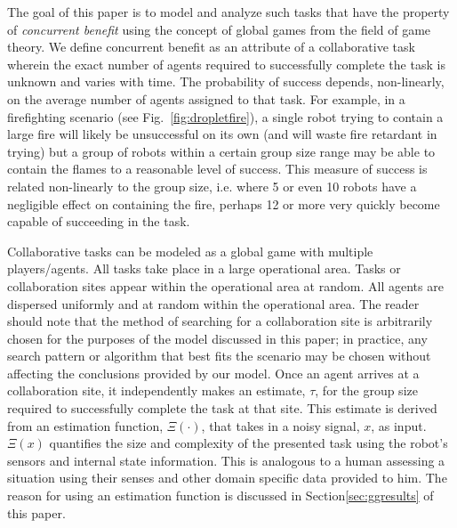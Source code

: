 \documentclass[conference]{ieeeconf}
\begin{document}
The goal of this paper is to model and analyze such tasks that have the property of \emph{concurrent benefit} using the concept of global games from the field of game theory. We define concurrent benefit as an attribute of a collaborative task wherein the exact number of agents required to successfully complete the task is unknown and varies with time. The probability of success depends, non-linearly, on the average number of agents assigned to that task. For example, in a firefighting scenario (see Fig.~\ref{fig:dropletfire}), a single robot trying to contain a large fire will likely be unsuccessful on its own (and will waste fire retardant in trying) but a group of robots within a certain group size range may be able to contain the flames to a reasonable level of success. This measure of success is related non-linearly to the group size, i.e. where 5 or even 10 robots have a negligible effect on containing the fire, perhaps 12 or more very quickly become capable of succeeding in the task.

Collaborative tasks can be modeled as a global game with multiple players/agents. All tasks take place in a large operational area. Tasks or collaboration sites appear within the operational area at random. All agents are dispersed uniformly and at random within the operational area. The reader should note that the method of searching for a collaboration site is arbitrarily chosen for the purposes of the model discussed in this paper; in practice, any search pattern or algorithm that best fits the scenario may be chosen without affecting the conclusions provided by our model. Once an agent arrives at a collaboration site, it independently makes an estimate, $\tau$, for the group size required to successfully complete the task at that site. This estimate is derived from an estimation function, $\Xi(\cdot)$, that takes in a noisy signal, $x$, as input. $\Xi(x)$ quantifies the size and complexity of the presented task using the robot's sensors and internal state information. This is analogous to a human assessing a situation using their senses and other domain specific data provided to him. The reason for using an estimation function is discussed in Section\ref{sec:ggresults} of this paper.
\end{document}
